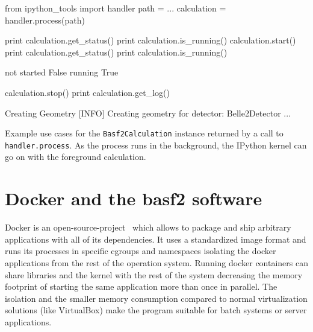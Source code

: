 \begin{listing}
\begin{inputipynb}
from ipython_tools import handler
path = ...
calculation = handler.process(path)
\end{inputipynb}
\begin{inputipynb}
print calculation.get_status()
print calculation.is_running()
calculation.start()
print calculation.get_status()
print calculation.is_running()
\end{inputipynb}
\begin{outputipynb}
not started
False
running
True
\end{outputipynb}
\begin{inputipynb}
calculation.stop()
print calculation.get_log()
\end{inputipynb}
\begin{outputipynb}[\theipythcntr]
[INFO] Creating Geometry
[INFO] Creating geometry for detector: Belle2Detector
...
\end{outputipynb}

  \caption[Example use cases for the Basf2Calculation objects.]{Example use cases for the \texttt{Basf2Calculation} instance returned by a call to \texttt{handler.process}. As the process runs in the background, the IPython kernel can go on with the foreground calculation.}
  \label{lis-calculation}
\end{listing}

\section{Docker and the basf2 software}

Docker is an open-source-project~\cite{docker} which allows to package and ship arbitrary applications with all of its dependencies. It uses a standardized image format and runs its processes in specific cgroups and namespaces isolating the docker applications from the rest of the operation system. Running docker containers can share libraries and the kernel with the rest of the system decreasing the memory footprint of starting the same application more than once in parallel. The isolation and the smaller memory consumption compared to normal virtualization solutions (like VirtualBox) make the program suitable for batch systems or server applications.

